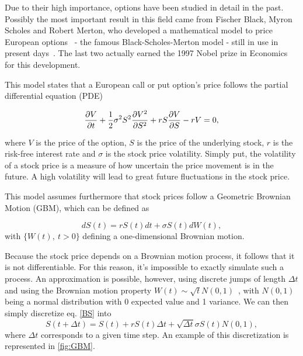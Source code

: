 \documentclass[a4paper,twocolumn,aps,prd,longbibliography,superscriptaddress]{revtex4-1}
\begin{document}
Due to their high importance, options have been studied in detail in the past.
Possibly the most important result in this field came from Fischer Black, Myron Scholes and Robert Merton, who developed a mathematical model to price European options~\cite{Scholes} - the famous Black-Scholes-Merton model - still in use in present days~\cite{Wilmott2}. The last two actually earned the 1997 Nobel prize in Economics for this development.

This model states that a European call or put option's price follows the partial differential equation (PDE)

\begin{equation}\label{BS2}
\pdv{V}{t}+\frac{1}{2}\sigma^2S^2\pdv{V^2}{S^2}+rS\pdv{V}{S}-rV=0,
\end{equation}

\noindent where $V$ is the price of the option, $S$ is the price of the underlying stock, $r$ is the risk-free interest rate and $\sigma$ is the stock price volatility.
Simply put, the volatility of a stock price is a measure of how uncertain the price movement is in the future. A high volatility will lead to great future fluctuations in the stock price.

This model assumes furthermore that stock prices follow a Geometric Brownian Motion (GBM), which can be defined as

\begin{equation}\label{BS}
dS(t)=rS(t)dt+\sigma S(t)dW(t),
\end{equation}
\noindent with $\{W(t),\ t>0\}$ defining a one-dimensional Brownian motion.

Because the stock price depends on a Brownian motion process, it follows that it is not differentiable. For this reason, it's impossible to exactly simulate such a process. An approximation is possible, however, using discrete jumps of length $\Delta t$ and using the Brownian motion property $W(t)\sim \sqrt{t}N(0,1)$~\cite{Mikosch}, with $N(0,1)$ being a normal distribution with 0 expected value and 1 variance.
We can then simply discretize eq. \eqref{BS} into
\begin{equation}
S(t+\Delta t)=S(t)+rS(t)\Delta t+\sqrt{\Delta t}\sigma S(t)N(0,1),
\end{equation}
\noindent where $\Delta t$ corresponds to a given time step. An example of this discretization is represented in \autoref{fig:GBM}.
\end{document}

